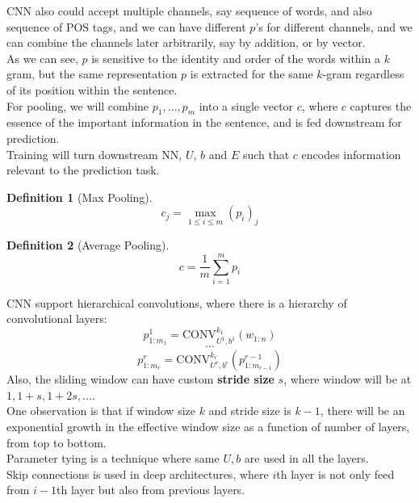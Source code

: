 \documentclass[12pt]{article}
\newtheorem{definition}{Definition}[section]
\theoremstyle{definition}
\begin{document}
CNN also could accept multiple channels, say sequence of words, and also sequence of POS tags, and we can have different $p$'s for different channels, and we can combine the channels later arbitrarily, say by addition, or by vector.\\
As we can see, $p$ is sensitive to the identity and order of the words within a $k$ gram, but the same representation $p$ is extracted for the same $k$-gram regardless of its position within the sentence.\\
For pooling, we will combine $p_1,\ldots, p_m$ into a single vector $c$, where $c$ captures the essence of the important information in the sentence, and is fed downstream for prediction.\\
Training will turn downstream NN, $U$, $b$ and $E$ such that $c$ encodes information relevant to the prediction task.\\
\begin{definition}[Max Pooling]
\[
c_j = \max_{1\leq i \leq m }(p_i)_j
\]
\end{definition}
\begin{definition}[Average Pooling]
\[
c=\frac{1}{m}\sum_{i=1}^m p_i
\]
\end{definition}
CNN support hierarchical convolutions, where there is a hierarchy of convolutional layers:
\[
p_{1:m_1}^1 = \text{CONV}_{U^1, b^1}^{k_1}(w_{1:n})
\]
\[
\cdots
\]
\[
p_{1:m_r}^r = \text{CONV}_{U^r, b^r}^{k_r}(p^{r-1}_{1:m_{r-1}})
\]
Also, the sliding window can have custom \textbf{stride size} $s$, where window will be at $1, 1+s, 1+2s, \ldots$.\\
One observation is that if window size $k$ and stride size is $k-1$, there will be an exponential growth in the effective window size as a function of number of layers, from top to bottom.\\
Parameter tying is a technique where same $U, b$ are used in all the layers.\\
Skip connections is used in deep architectures, where $i$th layer is not only feed from $i-1$th layer but also from previous layers.
\clearpage
\end{document}
